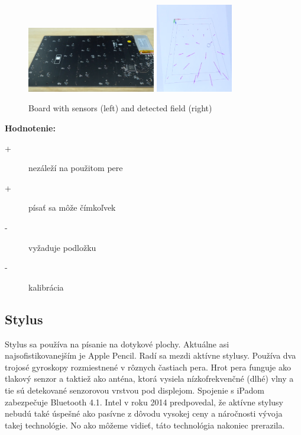 \begin{figure}[hbt]
	\centering
	\includegraphics[width=0.5\textwidth]{obrazky-figures/isknBoard.png}
	\includegraphics[width=0.3\textwidth]{obrazky-figures/isknMagneticfield.png}
	\caption{Board with sensors (left) and detected field (right)}
	\label{ISKN}
\end{figure}
\textbf{Hodnotenie:}
\begin{description}
	\item[+]{nezáleží na použitom pere}
	\item[+]{písať sa môže čímkoľvek}
	\item[-]{vyžaduje podložku}
	\item[-]{kalibrácia}
\end{description}

\subsection*{Stylus}

Stylus sa používa na písanie na dotykové plochy. Aktuálne asi najsofistikovanejším je Apple Pencil. Radí sa mezdi aktívne stylusy\cite{HarleyJonahA2013As}. Používa dva trojosé gyroskopy rozmiestnené v rôznych častiach pera. Hrot pera funguje ako tlakový senzor a taktiež ako anténa, ktorá vysiela nízkofrekvenčné (dlhé) vlny a tie sú detekované senzorovou vrstvou pod displejom. Spojenie s iPadom zabezpečuje Bluetooth 4.1\cite{ApplePencilForum}. Intel v roku 2014 predpovedal, že aktívne stylusy nebudú také úspešné ako pasívne z dôvodu vysokej ceny a náročnosti vývoja takej technológie\cite{IntelDisp}. No ako môžeme vidieť, táto technológia nakoniec prerazila.\newline

